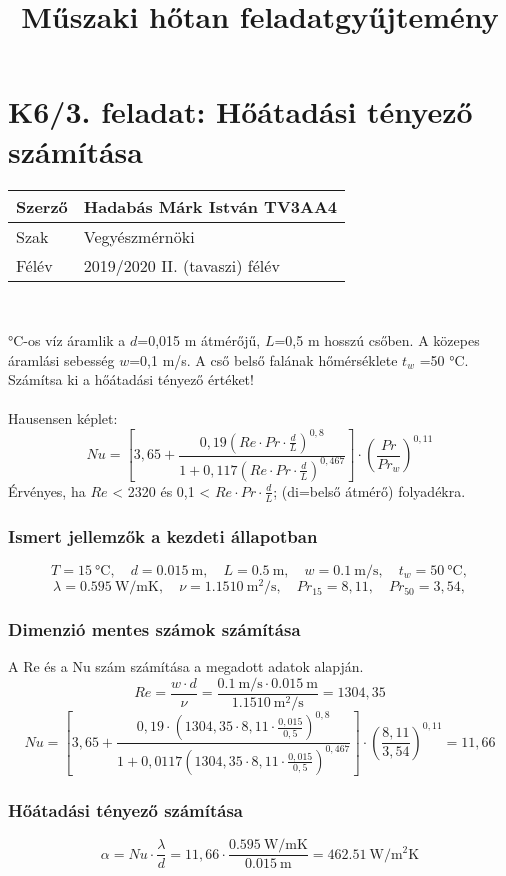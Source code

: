 \documentclass[11pt, a4paper]{report}
\author{}
\title{Műszaki hőtan feladatgyűjtemény}
\begin{document}
\section*{K6/3. feladat: Hőátadási tényező számítása}
	\begin{tabular}{ | p{2cm} | p{14cm} | } 
		\hline
		Szerző & Hadabás Márk István TV3AA4 \\ 
		\hline
		Szak & Vegyészmérnöki \\ 
		\hline
		Félév & 2019/2020 II. (tavaszi) félév \\ 
		\hline
	\end{tabular} \\
	\vspace{0.5cm} 
		
	 °C-os víz áramlik a $d$=0,015 m átmérőjű, $L$=0,5 m hosszú csőben. A közepes áramlási sebesség $w$=0,1 m/s. A cső belső falának hőmérséklete $t_w$ =50 °C. Számítsa ki a hőátadási tényező értéket!
	\\ \\
	Hausensen képlet:
		\[ Nu = \left[ 3,65 + \frac{0,19 \left( Re \cdot Pr \cdot \frac{d}{L} \right)^{0,8} }{1 + 0,117 \left( Re \cdot Pr \cdot \frac{d}{L} \right)^{0,467} } \right] \cdot \left( \frac{Pr}{Pr_w} \right)^{0,11}  \]
	Érvényes, ha $Re$ < 2320 és 0,1 < $Re \cdot Pr \cdot \frac{d}{L}$; (di=belső átmérő) folyadékra.
	\\ 
	\subsubsection{Ismert jellemzők a kezdeti állapotban}
		\begin{equation*}	
			T= \SI{15}{\celsius}, 
			\quad
			d= \SI{0,015}{\meter},
			\quad
			L= \SI{0,5}{\meter},
			\quad
			w= \SI{0,1}{\meter\per\second},
			\quad
			t_w= \SI{50}{\celsius},			
		\end{equation*}
		\begin{equation*}
			\lambda= \SI{0,595}{\watt\per\meter\kelvin},
			\quad
			\nu = \SI{1,15 10}{\meter\squared\per\second },
			\quad
			Pr_{15}= 8,11,
			\quad
			Pr_{50}= 3,54,			
		\end{equation*}
		\noindent\hrulefill
	\subsubsection{Dimenzió mentes számok számítása}
	A Re és a Nu szám számítása a megadott adatok alapján. 
		\begin{equation}
			Re = \frac{w \cdot d}{\nu} = \frac{\SI{0,1}{\meter\per\second} \cdot \SI{0,015}{\meter}}{\SI{1,15 10}{\meter\squared\per\second }}=1304,35
		\end{equation}
		\begin{equation}
			Nu = \left[ 3,65 + \frac{ 0,19 \cdot \left( 1304,35 \cdot 8,11 \cdot\frac{0,015}{0,5}\right)^{0,8}}{1 + 0,0117 \left( 1304,35 \cdot 8,11 \cdot \frac{0,015}{0,5}\right)^{0,467}}\right] \cdot \left( \frac{8,11}{3,54}\right)^{0,11}  = 11,66
		\end{equation}
	\subsubsection{Hőátadási tényező számítása}
		\begin{equation}
			\alpha = Nu \cdot \frac{\lambda}{d} = 11,66 \cdot \frac{\SI{0,595}{\watt\per\meter\kelvin}}{\SI{0,015}{\meter}}= \SI{462,51}{\watt\per\meter\squared\kelvin} 
		\end{equation}		
\end{document}
